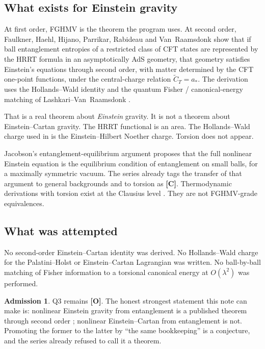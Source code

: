\documentclass[11pt]{article}
\theoremstyle{definition}
\newtheorem*{admission}{Admission}
\newcommand{\pC}{\textbf{[C]}}
\newcommand{\pO}{\textbf{[O]}}
\begin{document}
\subsection{What exists for Einstein gravity}

At first order, FGHMV \cite{FGHMV2014} is the theorem the program
uses. At second order, Faulkner, Haehl, Hijano, Parrikar, Rabideau
and Van~Raamsdonk \cite{FHHPRV2017} show that if ball entanglement
entropies of a restricted class of CFT states are represented by the
HRRT formula in an asymptotically AdS geometry, that geometry
satisfies Einstein's equations through second order, with matter
determined by the CFT one-point functions, under the central-charge
relation $\widetilde{C}_T=a_\ast$. The derivation uses the Hollands--Wald
identity \cite{HollandsWald2013} and the quantum Fisher /
canonical-energy matching of Lashkari--Van~Raamsdonk
\cite{LV2016}.

That is a real theorem about \emph{Einstein} gravity. It is not a
theorem about Einstein--Cartan gravity. The HRRT functional is an
area. The Hollands--Wald charge used in \cite{FHHPRV2017} is the
Einstein--Hilbert Noether charge. Torsion does not appear.

Jacobson's entanglement-equilibrium argument \cite{Jacobson2016}
proposes that the full nonlinear Einstein equation is the
equilibrium condition of entanglement on small balls, for a
maximally symmetric vacuum. The series already tags the transfer of
that argument to general backgrounds and to torsion as \pC{}.
Thermodynamic derivations with torsion exist at the Clausius level
\cite{Dey2017}. They are not FGHMV-grade equivalences.

\subsection{What was attempted}

No second-order Einstein--Cartan identity was derived. No
Hollands--Wald charge for the Palatini--Holst or
Einstein--Cartan Lagrangian was written. No ball-by-ball matching
of Fisher information to a torsional canonical energy at $O(\lambda^2)$
was performed.

\begin{admission}
Q3 remains \pO{}. The honest strongest statement this note can make
is: nonlinear Einstein gravity from entanglement is a published
theorem through second order \cite{FHHPRV2017}; nonlinear
Einstein--Cartan from entanglement is not. Promoting the former to
the latter by ``the same bookkeeping'' is a conjecture, and the
series already refused to call it a theorem.
\end{admission}
\end{document}
